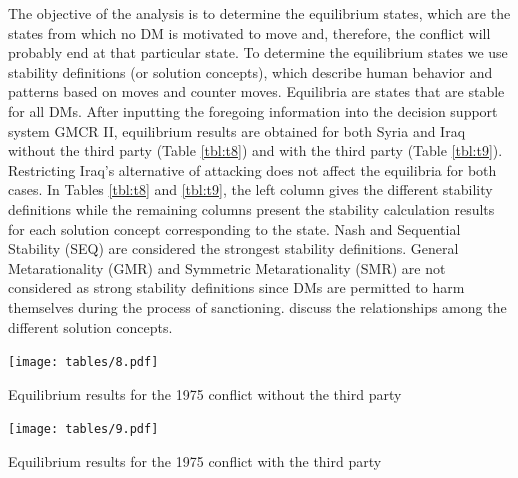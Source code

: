 \documentclass[letterpaper,12pt,titlepage,oneside,final]{book}
\begin{document}
The objective of the analysis is to determine the equilibrium states, which are the states from which no DM is motivated to move and, therefore, the conflict will probably end at that particular state. To determine the equilibrium states we use stability definitions (or solution concepts), which describe human behavior and patterns based on moves and counter moves. Equilibria are states that are stable for all DMs. After inputting the foregoing information into the decision support system GMCR II, equilibrium results are obtained for both Syria and Iraq without the third party (Table \ref{tbl:t8}) and with the third party (Table \ref{tbl:t9}). Restricting Iraq's alternative of attacking does not affect the equilibria for both cases. In Tables \ref{tbl:t8} and \ref{tbl:t9}, the left column gives the different stability definitions while the remaining columns present the stability calculation results for each solution concept corresponding to the state. Nash and Sequential Stability (SEQ) are considered the strongest stability definitions. General Metarationality (GMR) and Symmetric Metarationality (SMR) are not considered as strong stability definitions since DMs are permitted to harm themselves during the process of sanctioning. \citet{Fang1989} discuss the relationships among the different solution concepts.

\begin{table}[H]
\centering
\texttt{[image: tables/8.pdf]}

\caption{Equilibrium results for the 1975 conflict without the third party}

\label{tbl:t8}
\end{table}

\begin{table}[H]
\centering
\texttt{[image: tables/9.pdf]}

\caption{Equilibrium results for the 1975 conflict with the third party}

\label{tbl:t9}
\end{table}
\end{document}
